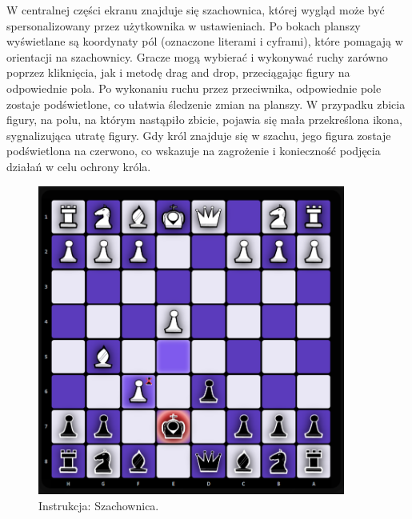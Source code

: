 \documentclass[12pt,a4paper]{article}
\begin{document}
\newpage

\noindent
W centralnej części ekranu znajduje się szachownica, której wygląd może być spersonalizowany przez użytkownika w ustawieniach. Po bokach planszy wyświetlane są koordynaty pól (oznaczone literami i cyframi), które pomagają w orientacji na szachownicy. Gracze mogą wybierać i wykonywać ruchy zarówno poprzez kliknięcia, jak i metodę drag and drop, przeciągając figury na odpowiednie pola. Po wykonaniu ruchu przez przeciwnika, odpowiednie pole zostaje podświetlone, co ułatwia śledzenie zmian na planszy. W przypadku zbicia figury, na polu, na którym nastąpiło zbicie, pojawia się mała przekreślona ikona, sygnalizująca utratę figury. Gdy król znajduje się w szachu, jego figura zostaje podświetlona na czerwono, co wskazuje na zagrożenie i konieczność podjęcia działań w celu ochrony króla.

\vspace{1cm}
\begin{figure}[h!]
    \centering
    \includegraphics[width=0.9\textwidth]{images/ins_min_board.png}
    \caption{Instrukcja: Szachownica.}
\end{figure}

\newpage
\end{document}
